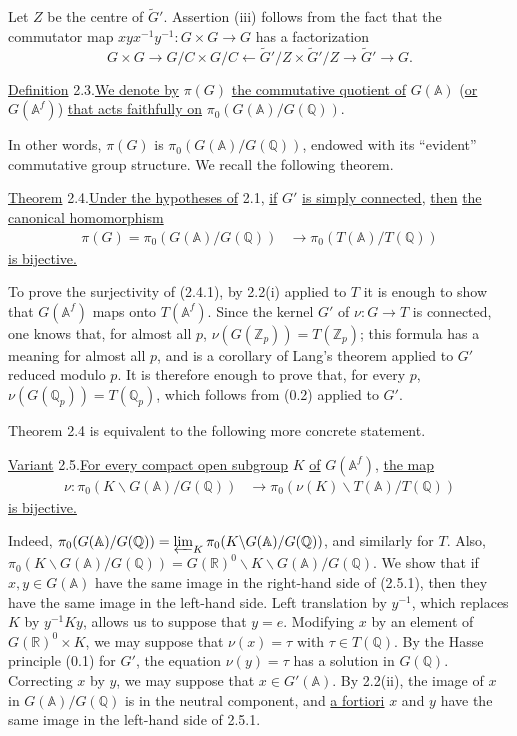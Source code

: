 \documentclass[10pt]{article}
\newcommand{\A}{\mathbb A}
\newcommand{\Af}{\mathbb A^f}
\newcommand{\Q}{\mathbb Q}
\newcommand{\R}{\mathbb R}
\newcommand{\Z}{\mathbb Z}
\newcommand{\limproj}{\varprojlim}
\begin{document}
Let $Z$ be the centre of $\widetilde G'$. Assertion (iii) follows from the fact that the commutator map $xyx^{-1}y^{-1}:G\times G\longrightarrow G$ has a factorization
\[
G\times G\longrightarrow G/C\times G/C\longleftarrow \widetilde G'/Z\times \widetilde G'/Z\longrightarrow \widetilde G'\longrightarrow G.
\]

\noindent\uline{Definition} 2.3.\quad \uline{We denote by} $\pi(G)$ \uline{the commutative quotient of} $G(\A)$ (\uline{or} $G(\Af)$) \uline{that acts faithfully on} $\pi_0(G(\A)/G(\Q))$.

In other words, $\pi(G)$ is $\pi_0(G(\A)/G(\Q))$, endowed with its ``evident'' commutative group structure. We recall the following theorem.

\noindent\uline{Theorem} 2.4.\quad \uline{Under the hypotheses of} 2.1, \uline{if} $G'$ \uline{is simply connected}, \uline{then} \uline{the canonical homomorphism}
\begingroup
\makeatletter
\tagsleft@true
\makeatother
\begin{align}
\pi(G)=\pi_0(G(\A)/G(\Q))&\longrightarrow \pi_0(T(\A)/T(\Q)) \tag{2.4.1}
\end{align}
\endgroup
\uline{is bijective.}

To prove the surjectivity of (2.4.1), by 2.2(i) applied to $T$ it is enough to show that $G(\Af)$ maps onto $T(\Af)$. Since the kernel $G'$ of $\nu:G\to T$ is connected, one knows that, for almost all $p$, $\nu(G(\Z_p))=T(\Z_p)$; this formula has a meaning for almost all $p$, and is a corollary of Lang's theorem applied to $G'$ reduced modulo $p$. It is therefore enough to prove that, for every $p$, $\nu(G(\Q_p))=T(\Q_p)$, which follows from (0.2) applied to $G'$.

Theorem 2.4 is equivalent to the following more concrete statement.

\noindent\uline{Variant} 2.5.\quad \uline{For every compact open subgroup} $K$ \uline{of} $G(\Af)$, \uline{the map}
\begingroup
\makeatletter
\tagsleft@true
\makeatother
\begin{align}
\nu:\pi_0(K\backslash G(\A)/G(\Q))&\longrightarrow\pi_0(\nu(K)\backslash T(\A)/T(\Q)) \tag{2.5.1}
\end{align}
\endgroup
\uline{is bijective.}

Indeed, $\pi_0(G(\A)/G(\Q))=\limproj_K\pi_0(K\backslash G(\A)/G(\Q))$, and similarly for $T$. Also, $\pi_0(K\backslash G(\A)/G(\Q))=G(\R)^0\backslash K\backslash G(\A)/G(\Q)$. We show that if $x,y\in G(\A)$ have the same image in the right-hand side of (2.5.1), then they have the same image in the left-hand side. Left translation by $y^{-1}$, which replaces $K$ by $y^{-1}Ky$, allows us to suppose that $y=e$. Modifying $x$ by an element of $G(\R)^0\times K$, we may suppose that $\nu(x)=\tau$ with $\tau\in T(\Q)$. By the Hasse principle (0.1) for $G'$, the equation $\nu(y)=\tau$ has a solution in $G(\Q)$. Correcting $x$ by $y$, we may suppose that $x\in G'(\A)$. By 2.2(ii), the image of $x$ in $G(\A)/G(\Q)$ is in the neutral component, and \uline{a fortiori} $x$ and $y$ have the same image in the left-hand side of 2.5.1.
\end{document}

